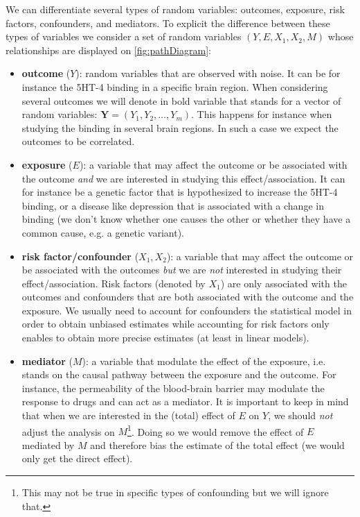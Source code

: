 \documentclass{article}
\begin{document}
We can differentiate several types of random variables: outcomes,
exposure, risk factors, confounders, and mediators. To explicit the
difference between these types of variables we consider a set of
random variables \((Y,E,X_1,X_2,M)\) whose relationships are
displayed on \autoref{fig:pathDiagram}:
\begin{itemize}
\item \textbf{outcome} (\(Y\)): random variables that are observed with noise. It
can be for instance the 5HT-4 binding in a specific brain
region. When considering several outcomes we will denote in bold
variable that stands for a vector of random variables:
\(\mathbf{Y}=(Y_1,Y_2,\ldots,Y_m)\). This happens for instance when
studying the binding in several brain regions. In such a case we
expect the outcomes to be correlated.
\item \textbf{exposure} (\(E\)): a variable that may affect the outcome or be
associated with the outcome \emph{and} we are interested in studying this
effect/association. It can for instance be a genetic factor that is
hypothesized to increase the 5HT-4 binding, or a disease like
depression that is associated with a change in binding (we don't
know whether one causes the other or whether they have a common
cause, e.g. a genetic variant).
\item \textbf{risk factor/confounder} (\(X_1,X_2\)): a variable that
may affect the outcome or be associated with the outcomes \emph{but} we
are \emph{not} interested in studying their effect/association. Risk
factors (denoted by \(X_1\)) are only associated with the outcomes
and confounders that are both associated with the outcome and the
exposure. We usually need to account for confounders the statistical
model in order to obtain unbiased estimates while accounting for
risk factors only enables to obtain more precise estimates (at least
in linear models).
\item \textbf{mediator} (\(M\)): a variable that modulate the effect of the
exposure, i.e. stands on the causal pathway between the exposure and
the outcome. For instance, the permeability of the blood-brain
barrier may modulate the response to drugs and can act as a
mediator. It is important to keep in mind that when we are
interested in the (total) effect of \(E\) on \(Y\), we should \emph{not}
adjust the analysis on \(M\)\footnote{This may not be true in specific types of confounding but we
will ignore that.}. Doing so we would remove the effect of
\(E\) mediated by \(M\) and therefore bias the estimate of the total
effect (we would only get the direct effect).
\end{itemize}
\end{document}
